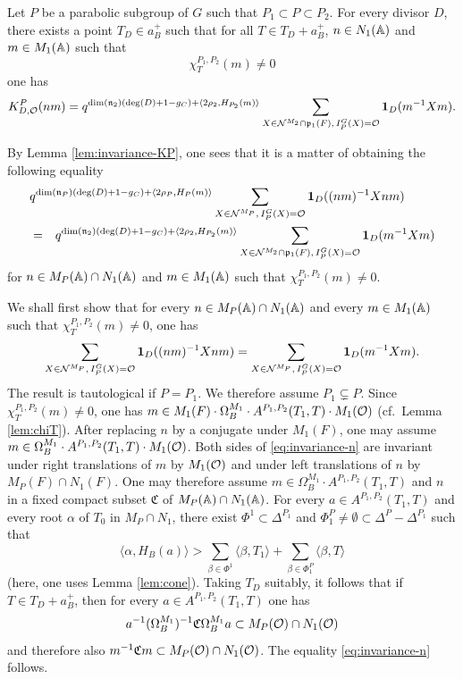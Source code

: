 \begin{paragr}
\begin{lemme}\label{lem:KP-egalite}
  Let $P$ be a parabolic subgroup of $G$ such that $P_1\subset P\subset P_2$. For every divisor $D$, there exists a point $T_D\in a_B^+$ such that for all $T\in T_D+a_B^+$, $n\in N_1(\mathbb{A})$ and $m\in M_1(\mathbb{A})$ such that
$$\chi_T^{P_1,P_2}(m)\neq 0$$
one has
$$K^P_{D,\mathcal{O}}(nm)= q^{\dim(\mathfrak{n}_2)(\deg(D)+1-g_C)+\langle 2\rho_2,H_{P_2}(m)\rangle} \sum_{X\in \mathcal{N}^{M_2}\cap \mathfrak{p}_1(F),\, I_P^G(X)=\mathcal{O}} \mathbf{1}_D(m^{-1}Xm).$$
\end{lemme}

\begin{preuve}
  By Lemma \ref{lem:invariance-KP}, one sees that it is a matter of obtaining the following equality
\begin{eqnarray*}
  \lefteqn{q^{\dim(\ngo_P)(\deg(D)+1-g_C)+\langle 2\rho_P,H_P(m)\rangle} \sum_{X\in \nc^{M_P},\, I_P^G(X)=\oc} \mathbf{1}_D((nm)^{-1}Xnm)}\\
  &=& q^{\dim(\ngo_2)(\deg(D)+1-g_C)+\langle 2\rho_2,H_{P_2}(m)\rangle} \sum_{X\in \nc^{M_2}\cap \pgo_1(F),\, I_P^G(X)=\oc} \mathbf{1}_D(m^{-1}Xm)
\end{eqnarray*}
for $n\in M_P(\mathbb{A})\cap N_1(\mathbb{A})$ and $m\in M_1(\mathbb{A})$ such that $\chi_T^{P_1,P_2}(m)\neq 0$.

We shall first show that for every $n\in M_P(\mathbb{A})\cap N_1(\mathbb{A})$ and every $m\in M_1(\mathbb{A})$ such that $\chi_T^{P_1,P_2}(m)\neq 0$, one has
\begin{equation}
  \label{eq:invariance-n}
  \sum_{X\in \mathcal{N}^{M_P},\, I_P^G(X)=\mathcal{O}} \mathbf{1}_D((nm)^{-1}Xnm)=\sum_{X\in \mathcal{N}^{M_P},\, I_P^G(X)=\mathcal{O}} \mathbf{1}_D(m^{-1}Xm).
\end{equation}
The result is tautological if $P=P_1$. We therefore assume $P_1\subsetneq P$. Since $\chi_T^{P_1,P_2}(m)\neq 0$, one has $m\in M_1(F)\cdot \Omega_B^{M_1}\cdot A^{P_1,P_2}(T_1,T)\cdot M_1(\mathcal{O})$ (cf.\ Lemma \ref{lem:chiT}). After replacing $n$ by a conjugate under $M_1(F)$, one may assume $m\in \Omega_B^{M_1}\cdot A^{P_1,P_2}(T_1,T)\cdot M_1(\mathcal{O})$. Both sides of \eqref{eq:invariance-n} are invariant under right translations of $m$ by $M_1(\mathcal{O})$ and under left translations of $n$ by $M_P(F)\cap N_1(F)$. One may therefore assume $m\in \Omega_B^{M_1}\cdot A^{P_1,P_2}(T_1,T)$ and $n$ in a fixed compact subset $\mathfrak{C}$ of $M_P(\mathbb{A})\cap N_1(\mathbb{A})$. For every $a\in A^{P_1,P_2}(T_1,T)$ and every root $\alpha$ of $T_0$ in $M_P\cap N_1$, there exist $\Phi^1\subset \Delta^{P_1}$ and $\Phi_1^P\neq \emptyset \subset \Delta^P-\Delta^{P_1}$ such that
$$\langle \alpha, H_B(a)\rangle > \sum_{\beta\in \Phi^1} \langle \beta,T_1\rangle + \sum_{\beta\in \Phi_1^P} \langle \beta,T\rangle$$
(here, one uses Lemma \ref{lem:cone}). Taking $T_D$ suitably, it follows that if $T\in T_D+a_B^+$, then for every $a\in A^{P_1,P_2}(T_1,T)$ one has
$$a^{-1}(\Omega_B^{M_1})^{-1}\mathfrak{C}\Omega_B^{M_1}a\subset M_P(\mathcal{O})\cap N_1(\mathcal{O})$$
and therefore also $m^{-1}\mathfrak{C}m\subset M_P(\mathcal{O})\cap N_1(\mathcal{O})$. The equality \eqref{eq:invariance-n} follows.


\end{preuve}
\end{paragr}
